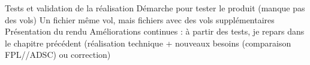 Tests et validation de la réalisation
            Démarche pour tester le produit (manque pas des vols)
            Un fichier même vol, mais fichiers avec des vols supplémentaires
            Présentation du rendu
Améliorations continues : à partir des tests, je repars dans le chapitre précédent (réalisation technique + nouveaux besoins (comparaison FPL//ADSC) ou correction)
